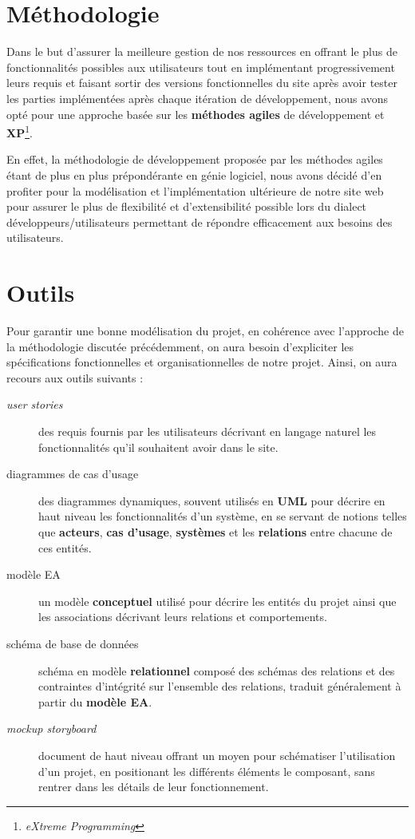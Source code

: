 \documentclass[a4paper,12pt]{book}
\theoremstyle{break}
\theoremstyle{break}
\theoremstyle{break}
\theoremstyle{break}
\theoremstyle{definition}
\theoremstyle{remark}
\begin{document}
\section{Méthodologie}
Dans le but d'assurer la meilleure gestion de nos ressources en offrant le plus de fonctionnalités possibles aux utilisateurs tout en implémentant progressivement leurs requis et faisant sortir des versions fonctionnelles du site après avoir tester les parties implémentées après chaque itération de développement, nous avons opté pour une approche basée sur les \textbf{méthodes agiles} de développement et \textbf{XP}\footnote{\textit{eXtreme Programming}}.

En effet, la méthodologie de développement proposée par les méthodes agiles étant de plus en plus prépondérante en génie logiciel, nous avons décidé d'en profiter pour la modélisation et l'implémentation ultérieure de notre site web pour assurer le plus de flexibilité et d'extensibilité possible lors du dialect développeurs/utilisateurs permettant de répondre efficacement aux besoins des utilisateurs.
\section{Outils}
Pour garantir une bonne modélisation du projet, en cohérence avec l'approche de la méthodologie discutée précédemment, on aura besoin d'expliciter les spécifications fonctionnelles et organisationnelles de notre projet. Ainsi, on aura recours aux outils suivants :
\begin{description}
  \item[\textit{user stories}]{des requis fournis par les utilisateurs décrivant en langage naturel les fonctionnalités qu'il souhaitent avoir dans le site.}
  \item[diagrammes de cas d'usage]{des diagrammes dynamiques, souvent utilisés en \textbf{UML} pour décrire en haut niveau les fonctionnalités d'un système, en se servant de notions telles que \textbf{acteurs}, \textbf{cas d'usage}, \textbf{systèmes} et les \textbf{relations} entre chacune de ces entités.}
  \item[modèle EA]{un modèle \textbf{conceptuel} utilisé pour décrire les entités du projet ainsi que les associations décrivant leurs relations et comportements.}
  \item[schéma de base de données]{schéma en modèle \textbf{relationnel} composé des schémas des relations et des contraintes d'intégrité sur l'ensemble des relations, traduit généralement à partir du \textbf{modèle EA}.}
  \item[\textit{mockup storyboard}]{document de haut niveau offrant un moyen pour schématiser l'utilisation d'un projet, en positionant les différents éléments le composant, sans rentrer dans les détails de leur fonctionnement.}
\end{description}
\end{document}
